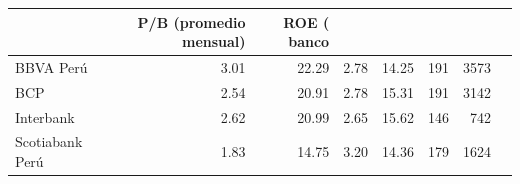 \begin{tabular}{lrrrrrr}
\toprule
 & P/B (promedio mensual) & ROE (%
banco &  &  &  &  &  &  \\
\midrule
BBVA Perú & 3.01 & 22.29 & 2.78 & 14.25 & 191 & 3573 \\
BCP & 2.54 & 20.91 & 2.78 & 15.31 & 191 & 3142 \\
Interbank & 2.62 & 20.99 & 2.65 & 15.62 & 146 & 742 \\
Scotiabank Perú & 1.83 & 14.75 & 3.20 & 14.36 & 179 & 1624 \\
\bottomrule
\end{tabular}
